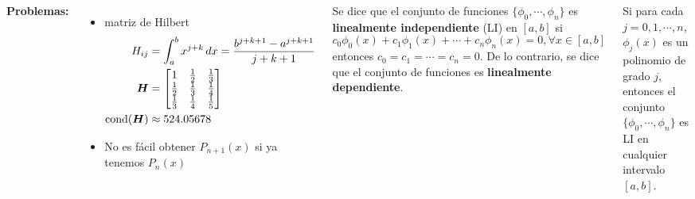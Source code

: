 \documentclass[9pt, aspectratio=169]{beamer}
\begin{document}
\begin{frame}
  \begin{columns}[t]
    \textbf{Problemas:}
    \begin{itemize}
      \item matriz de Hilbert
            \begin{align*}
              H_{ij}        & = \int_a^b x^{j+k} \, dx = \frac{b^{j+k+1} - a^{j+k+1}}{j + k + 1} \\
              \bm{H}        & = \begin{bmatrix}
                                  1           & \frac{1}{2} & \frac{1}{3} \\
                                  \frac{1}{2} & \frac{1}{3} & \frac{1}{4} \\
                                  \frac{1}{3} & \frac{1}{4} & \frac{1}{5} \\
                                \end{bmatrix}                        \\
              \operatorname{cond}(\bm{H}) & \approx 524.05678
            \end{align*} \pause
      \item No es fácil obtener $P_{n+1}(x)$ si ya tenemos $P_n(x)$
    \end{itemize} \pause

    \begin{definition}
      Se dice que el conjunto de funciones $\{ \phi_0, \cdots, \phi_n \}$ es \textbf{linealmente independiente} (LI) en $[a, b]$ si
      \[ c_0 \phi_0(x) + c_1 \phi_1(x) + \cdots + c_n \phi_n(x) = 0, \forall x \in [a, b] \]
      entonces $c_0 = c_1 = \cdots = c_n = 0$. De lo contrario, se dice que el conjunto de funciones es \textbf{linealmente dependiente}.
    \end{definition}  \pause

    \begin{theorem}[Polinomios LI]
      Si para cada $j = 0, 1, \cdots, n$, $\phi_j(x)$ es un polinomio de grado $j$, entonces el conjunto $\{ \phi_0, \cdots, \phi_n \}$ es LI en cualquier intervalo $[a, b]$.
    \end{theorem}

  \end{columns}
\end{frame}
\end{document}
